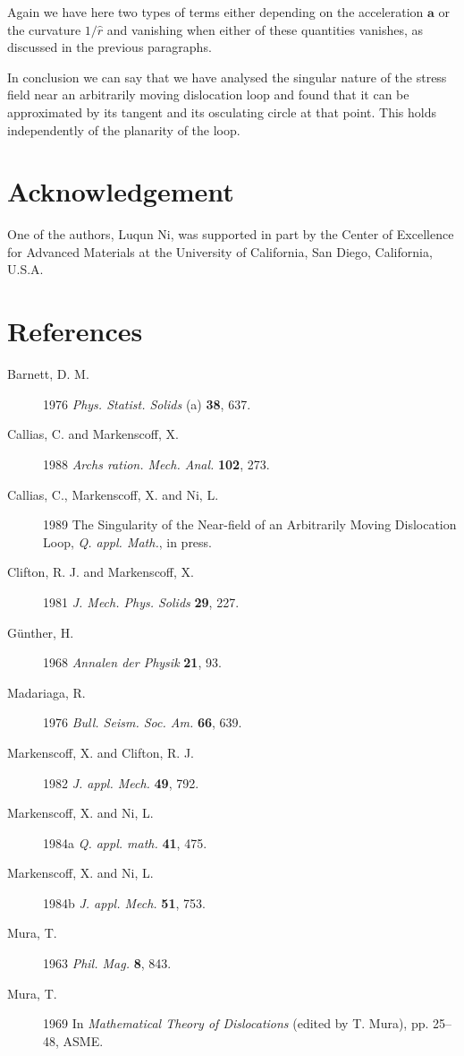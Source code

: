 \documentclass[12pt]{article}
\begin{document}
Again we have here two types of terms either depending on the acceleration $\mathbf{a}$ or the curvature $1/\hat{r}$ and vanishing when either of these quantities vanishes, as discussed in the previous paragraphs.

In conclusion we can say that we have analysed the singular nature of the stress field near an arbitrarily moving dislocation loop and found that it can be approximated by its tangent and its osculating circle at that point. This holds independently of the planarity of the loop.

\section*{Acknowledgement}

One of the authors, Luqun Ni, was supported in part by the Center of Excellence for Advanced Materials at the University of California, San Diego, California, U.S.A.

\section*{References}

\begin{description}
\item[Barnett, D. M.] 1976 \textit{Phys. Statist. Solids} (a) \textbf{38}, 637.
\item[Callias, C. and Markenscoff, X.] 1988 \textit{Archs ration. Mech. Anal.} \textbf{102}, 273.
\item[Callias, C., Markenscoff, X. and Ni, L.] 1989 The Singularity of the Near-field of an Arbitrarily Moving Dislocation Loop, \textit{Q. appl. Math.}, in press.
\item[Clifton, R. J. and Markenscoff, X.] 1981 \textit{J. Mech. Phys. Solids} \textbf{29}, 227.
\item[G\"unther, H.] 1968 \textit{Annalen der Physik} \textbf{21}, 93.
\item[Madariaga, R.] 1976 \textit{Bull. Seism. Soc. Am.} \textbf{66}, 639.
\item[Markenscoff, X. and Clifton, R. J.] 1982 \textit{J. appl. Mech.} \textbf{49}, 792.
\item[Markenscoff, X. and Ni, L.] 1984a \textit{Q. appl. math.} \textbf{41}, 475.
\item[Markenscoff, X. and Ni, L.] 1984b \textit{J. appl. Mech.} \textbf{51}, 753.
\item[Mura, T.] 1963 \textit{Phil. Mag.} \textbf{8}, 843.
\item[Mura, T.] 1969 In \textit{Mathematical Theory of Dislocations} (edited by T. Mura), pp. 25--48, ASME.
\end{description}
\end{document}
